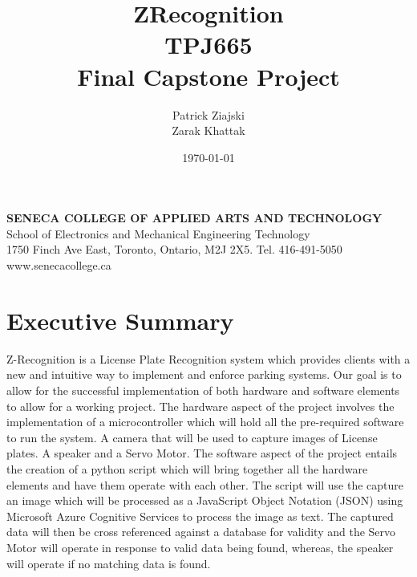 \documentclass[a4paper,12pt]{article}
\title{ZRecognition\\TPJ665\\Final Capstone Project}
\author{Patrick Ziajski \\ Zarak Khattak}
\date{\today}
\begin{document}
\maketitle
\vfill
\begin{center}
    \textbf{SENECA COLLEGE OF APPLIED ARTS AND TECHNOLOGY}\\School of Electronics and Mechanical Engineering Technology\\1750 Finch Ave East, Toronto, Ontario, M2J 2X5. Tel. 416-491-5050\\www.senecacollege.ca
\end{center}
\thispagestyle{empty}

\newpage
\tableofcontents
\newpage
\listoffigures
\listoftables


\newpage
{}
\section{Executive Summary}
Z-Recognition is a License Plate Recognition system which provides clients with a new and intuitive way to implement and enforce parking systems. Our goal is to allow for the successful implementation of both hardware and software elements to allow for a working project.
The hardware aspect of the project involves the implementation of a microcontroller which will hold all the pre-required software to run the system. A camera that will be used to capture images of License plates. A speaker and a Servo Motor. 
The software aspect of the project entails the creation of a python script which will bring together all the hardware elements and have them operate with each other. The script will use the capture an image which will be processed as a JavaScript Object Notation (JSON) using Microsoft Azure Cognitive Services to process the image as text. The captured data will then be cross referenced against a database for validity and the Servo Motor will operate in response to valid data being found, whereas, the speaker will operate if no matching data is found.


\end{document}
